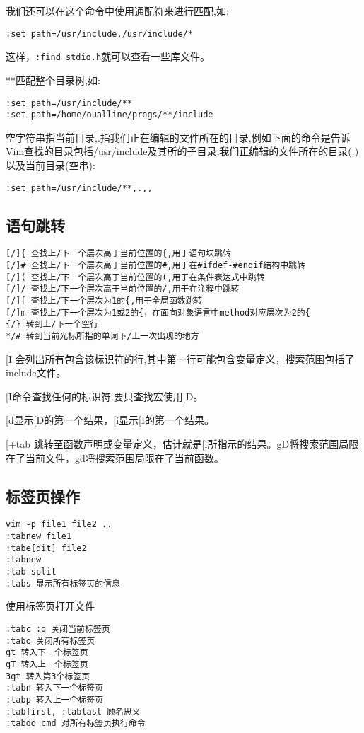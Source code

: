 我们还可以在这个命令中使用通配符来进行匹配,如:
\begin{verbatim}
:set path=/usr/include,/usr/include/*
\end{verbatim}
这样，\verb+:find stdio.h+就可以查看一些库文件。

**匹配整个目录树,如:
\begin{verbatim}
:set path=/usr/include/**
:set path=/home/oualline/progs/**/include
\end{verbatim}
空字符串指当前目录,.指我们正在编辑的文件所在的目录,例如下面的命令是告诉Vim查找的目录包括/usr/include及其所的子目录,我们正编辑的文件所在的目录(.)以及当前目录(空串):
\begin{verbatim}
:set path=/usr/include/**,.,,
\end{verbatim}

\subsection{语句跳转}
\begin{verbatim}
[/]{ 查找上/下一个层次高于当前位置的{,用于语句块跳转
[/]# 查找上/下一个层次高于当前位置的#,用于在#ifdef-#endif结构中跳转
[/]( 查找上/下一个层次高于当前位置的(,用于在条件表达式中跳转
[/]/ 查找上/下一个层次高于当前位置的/,用于在注释中跳转
[/][ 查找上/下一个层次为1的{,用于全局函数跳转
[/]m 查找上/下一个层次为1或2的{，在面向对象语言中method对应层次为2的{
{/} 转到上/下一个空行
*/# 转到当前光标所指的单词下/上一次出现的地方
\end{verbatim}
[I 会列出所有包含该标识符的行,其中第一行可能包含变量定义，搜索范围包括了include文件。

[I命令查找任何的标识符.要只查找宏使用[D。

[d显示[D的第一个结果，[i显示[I的第一个结果。

[+tab 跳转至函数声明或变量定义，估计就是[i所指示的结果。gD将搜索范围局限在了当前文件，gd将搜索范围局限在了当前函数。

\subsection{标签页操作}

\begin{verbatim}
vim -p file1 file2 ..
:tabnew file1
:tabe[dit] file2
:tabnew
:tab split
:tabs 显示所有标签页的信息
\end{verbatim}
使用标签页打开文件

\begin{verbatim}
:tabc :q 关闭当前标签页
:tabo 关闭所有标签页
gt 转入下一个标签页
gT 转入上一个标签页
3gt 转入第3个标签页
:tabn 转入下一个标签页
:tabp 转入上一个标签页
:tabfirst, :tablast 顾名思义
:tabdo cmd 对所有标签页执行命令
\end{verbatim}





